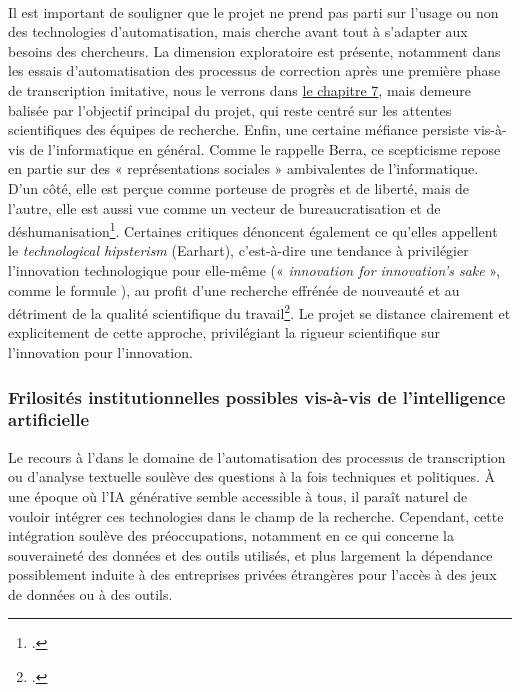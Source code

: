 \newline
{}\\

Il est important de souligner que le projet \pense ne prend pas parti sur l’usage ou non des technologies d’automatisation, mais cherche avant tout à s’adapter aux besoins des chercheurs. La dimension exploratoire est présente, notamment dans les essais d’automatisation des processus de correction après une première phase de transcription imitative, nous le verrons dans \hyperlink{chap7}{le chapitre 7}, mais demeure balisée par l’objectif principal du projet, qui reste centré sur les attentes scientifiques des équipes de recherche. 
Enfin, une certaine méfiance persiste vis-à-vis de l’informatique en général. Comme le rappelle Berra, ce scepticisme repose en partie sur des « représentations sociales » ambivalentes de l’informatique. D’un côté, elle est perçue comme porteuse de progrès et de liberté, mais de l’autre, elle est aussi vue comme un vecteur de bureaucratisation et de déshumanisation\footcite[p.614]{berra_pour_2015}. 
Certaines critiques dénoncent également ce qu’elles appellent le \textit{technological hipsterism} (Earhart), c’est-à-dire une tendance à privilégier l’innovation technologique pour elle-même (« \textit{innovation for innovation’s sake} », comme le formule \citeauthor{earhart_digital_2012}), au profit d’une recherche effrénée de nouveauté et au détriment de la qualité scientifique du travail\footcite[p.24]{earhart_digital_2012}. Le projet \pense se distance clairement et explicitement de cette approche, privilégiant la rigueur scientifique sur l’innovation pour l’innovation. 

\subsubsection{Frilosités institutionnelles possibles vis-à-vis de l’intelligence artificielle}

Le recours à l’\ia dans le domaine de l’automatisation des processus de transcription ou d’analyse textuelle soulève des questions à la fois techniques et politiques. À une époque où l’IA générative semble accessible à tous, il paraît naturel de vouloir intégrer ces technologies dans le champ de la recherche. Cependant, cette intégration soulève des préoccupations, notamment en ce qui concerne la souveraineté des données et des outils utilisés, et plus largement la dépendance possiblement induite à des entreprises privées étrangères pour l’accès à des jeux de données ou à des outils.
\newline
{}\\

